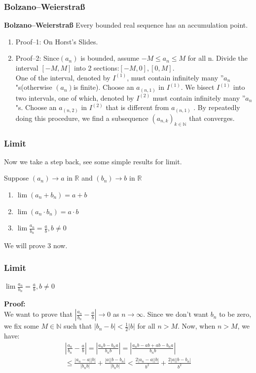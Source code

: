 \documentclass[12pt, t]{beamer}
\begin{document}
\begin{frame}
    \frametitle{\textbf{Bolzano--Weierstraß}}
\textbf{Bolzano--Weierstraß} Every bounded real sequence has an accumulation point.
\begin{enumerate}
    \item Proof--1: On Horst's Slides.
    \item Proof--2:
        Since$(a_n)$ is bounded, assume $-M\leq a_n\leq M$ for all n. Divide the interval $[-M,M]$ into 2 sections:$[-M,0],[0,M]$.\\
        One of the interval, denoted by $I^{(1)}$, must contain infinitely many ''$a_n$"s(otherwise $(a_n)$is finite). Choose an $a_{(n,1)}$ 
        in $I^{(1)}$. We bisect $I^{(1)}$ into two intervals, one of which, denoted by $I^{(2)}$ must contain 
        infinitely many ''$a_n$ "s. Choose an $a_{(n,2)}$ in $I^{(2)}$ that is different from $a_{(n,1)}$ . By 
        repeatedly doing this procedure, we find a subsequence $(a_{n,k})_{k\in\mathbb{N}}$ that converges.
\end{enumerate}
\end{frame}

\begin{frame}
    \frametitle{Limit}
Now we take a step back, see some simple results for limit.\\
\begin{center}
    Suppose $(a_n)\rightarrow a$ in $\mathbb{R}$ and $(b_n)\rightarrow b$ in $\mathbb{R}$  
\end{center}
\begin{enumerate}
    \item $\lim (a_n+b_n)=a+b$
    \item $\lim (a_n\cdot b_n) =a\cdot b$
    \item $\lim \frac{a_n}{b_n}=\frac{a}{b}, b\neq 0$
\end{enumerate}
We will prove 3 now.
\end{frame}

\begin{frame}
    \frametitle{Limit}
    \begin{center}
        $\lim \frac{a_n}{b_n}=\frac{a}{b}, b\neq 0$
    \end{center}
    \textbf{Proof:}\\
    \hspace{1em} We want to prove that $|\frac{a_n}{b_n}-\frac{a}{b}|\rightarrow 0$ as $n\rightarrow \infty$.
    Since we don't want $b_n$ to be zero, we fix some $M\in \mathbb{N}$ such that $|b_n-b|<\frac{1}{2}|b|$ for 
    all $n>M$. Now, when $n>M$, we have:
    \begin{multline*}
        |\frac{a_n}{b_n}-\frac{a}{b}| 
    = |\frac{a_nb-b_na}{b_nb}|=|\frac{a_nb-ab+ab-b_na}{b_nb}| \\
     \leq \frac{|a_n-a||b|}{|b_nb|}+\frac{|a||b-b_n|}{|b_nb|} 
     <\frac{2|a_n-a||b|}{b^2}+\frac{2|a||b-b_n|}{b^2}
    \end{multline*}
\end{frame}
    
\end{document}

